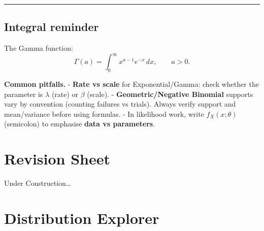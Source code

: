 \documentclass[
  letterpaper,
  DIV=11,
  numbers=noendperiod]{scrreprt}
\theoremstyle{definition}
\theoremstyle{plain}
\theoremstyle{definition}
\theoremstyle{remark}
\begin{document}
\begin{center}\rule{0.5\linewidth}{0.5pt}\end{center}

\section*{Integral reminder}\label{integral-reminder}


The Gamma function: \[
\Gamma(a)=\int_0^\infty x^{a-1}e^{-x}\,dx, \qquad a>0.
\]

\begin{tcolorbox}[enhanced jigsaw, left=2mm, toprule=.15mm, breakable, opacityback=0, titlerule=0mm, toptitle=1mm, colbacktitle=quarto-callout-important-color!10!white, colframe=quarto-callout-important-color-frame, coltitle=black, rightrule=.15mm, leftrule=.75mm, bottomrule=.15mm, arc=.35mm, bottomtitle=1mm, title=\textcolor{quarto-callout-important-color}{\faExclamation}\hspace{0.5em}{Important}, colback=white, opacitybacktitle=0.6]

\textbf{Common pitfalls.} - \textbf{Rate vs scale} for
Exponential/Gamma: check whether the parameter is \(\lambda\) (rate) or
\(\beta\) (scale). - \textbf{Geometric/Negative Binomial} supports vary
by convention (counting failures vs trials). Always verify support and
mean/variance before using formulas. - In likelihood work, write
\(f_X(x;\theta)\) (semicolon) to emphasise \textbf{data vs parameters}.

\end{tcolorbox}

\chapter*{Revision Sheet}\label{revision-sheet}


Under Construction\ldots{}

\chapter*{Distribution Explorer}\label{distribution-explorer}

\end{document}
